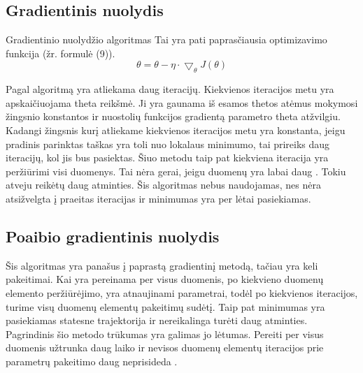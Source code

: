 \documentclass{VUMIFInfKursinis}
\begin{document}
\subsection{Gradientinis nuolydis}
Gradientinio nuolydžio algoritmas
Tai yra pati paprasčiausia optimizavimo funkcija  (žr. formulė (9)).
\begin{equation}
\theta = \theta - \eta \cdot \bigtriangledown_{\theta}J(\theta)
\end{equation}
\par
Pagal algoritmą yra atliekama daug iteracijų. Kiekvienos iteracijos metu yra
apskaičiuojama theta reikšmė. Ji yra gaunama iš esamos thetos atėmus mokymosi žingsnio konstantos
ir nuostolių funkcijos gradientą parametro theta atžvilgiu. Kadangi žingsnis kurį
atliekame kiekvienos iteracijos metu yra konstanta, jeigu pradinis parinktas taškas
yra toli nuo lokalaus minimumo, tai prireiks daug iteracijų, kol jis bus pasiektas.
Šiuo metodu taip pat kiekviena iteracija yra peržiūrimi visi duomenys. Tai nėra 
gerai, jeigu duomenų yra labai daug \cite{salt8}. Tokiu atveju reikėtų daug atminties. Šis algoritmas nebus naudojamas, nes nėra
atsižvelgta į praeitas iteracijas ir minimumas yra per lėtai pasiekiamas.

\subsection{Poaibio gradientinis nuolydis}
 Šis algoritmas yra panašus į paprastą gradientinį metodą, tačiau yra keli pakeitimai.
 Kai yra pereinama per visus duomenis, po kiekvieno duomenų elemento peržiūrėjimo,
 yra atnaujinami parametrai, todėl po kiekvienos iteracijos, turime visų duomenų
 elementų pakeitimų sudėtį. Taip pat minimumas yra pasiekiamas statesne trajektorija ir
 nereikalinga turėti daug atminties. Pagrindinis šio metodo trūkumas yra galimas jo
 lėtumas. Pereiti per visus duomenis užtrunka daug laiko ir nevisos duomenų elementų
 iteracijos prie parametrų pakeitimo daug neprisideda \cite{salt9}.
\end{document}
